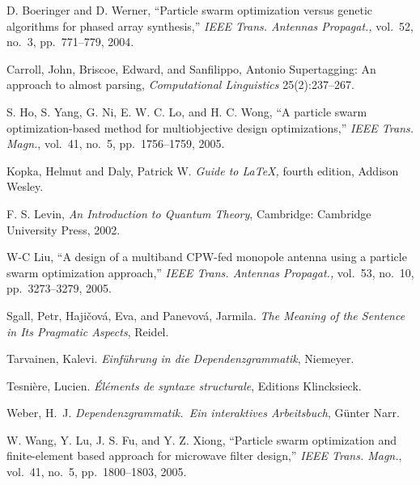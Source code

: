 
\blankpage

\begin{thebibliography}{xx}

D. Boeringer and D. Werner,
``Particle swarm optimization versus genetic algorithms for
phased array synthesis,''
\textit{IEEE Trans. Antennas Propagat.,}
vol.~52, no.~3, pp.~771--779, 2004.

Carroll, John, Briscoe, Edward, and Sanfilippo, Antonio
Supertagging: An approach to almost parsing,
\textit{Computational Linguistics} 25(2):237--267.

S. Ho, S. Yang, G. Ni, E. W. C. Lo, and H. C. Wong,
``A particle swarm optimization-based method for multiobjective
design optimizations,''
\textit{IEEE Trans. Magn.},
vol.~41, no.~5, pp.~1756--1759, 2005.

Kopka, Helmut and Daly, Patrick W. 
\textit{Guide to \LaTeX,} fourth edition, Addison Wesley.

F. S. Levin,
\textit{An Introduction to Quantum Theory},
Cambridge: Cambridge University Press, 2002.

W-C Liu,
``A design of a multiband
CPW-fed monopole antenna using a particle swarm optimization approach,''
\textit{IEEE Trans. Antennas Propagat.,}
vol.~53, no.~10, pp.~3273--3279, 2005.

Sgall, Petr, Haji\v{c}ov\'{a}, Eva, and Panevov\'{a}, Jarmila.
\textit{The Meaning of the Sentence in Its Pragmatic Aspects}, Reidel.

Tarvainen, Kalevi.  
\textit{Einf\"{u}hrung in die {D}ependenzgrammatik}, Niemeyer.

Tesni{\`e}re, Lucien.  
\textit{\'El\'ements de syntaxe structurale}, Editions Klincksieck.

Weber, H.~J. 
\textit{Dependenzgrammatik.\ Ein interaktives Arbeitsbuch},
G\"unter Narr.

W. Wang, Y. Lu, J. S. Fu, and Y. Z. Xiong,
``Particle swarm optimization and finite-element based
approach for microwave filter design,''
\textit{IEEE Trans. Magn.},
vol.~41, no.~5, pp.~1800--1803, 2005.

\end{thebibliography}

\clearpage


